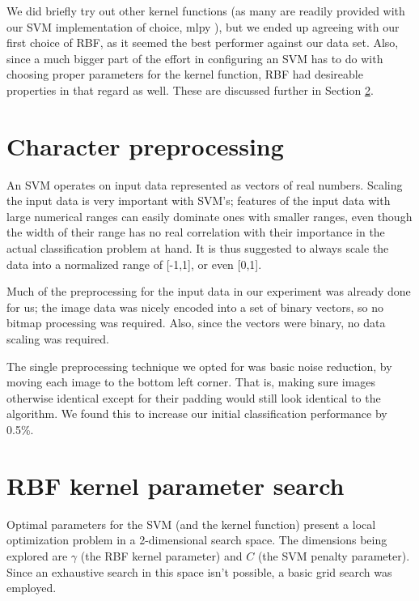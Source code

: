 \documentclass{netsec2012}
\begin{document}
We did briefly try out other kernel functions (as many are readily provided with our SVM
implementation of choice, mlpy \cite{albanese12mlpy}), but we ended up agreeing with our first
choice of RBF, as it seemed the best performer against our data set.  Also, since a much bigger part
of the effort in configuring an SVM has to do with choosing proper parameters for the kernel
function, RBF had desireable properties in that regard as well.  These are discussed further in
Section \ref{ref:kernelparamsearch}.

\section{Character preprocessing}

An SVM operates on input data represented as vectors of real numbers.  Scaling the input data is
very important with SVM's; features of the input data with large numerical ranges can easily
dominate ones with smaller ranges, even though the width of their range has no real correlation with
their importance in the actual classification problem at hand.  It is thus suggested to always scale
the data into a normalized range of [-1,1], or even [0,1]. \cite{libsvm_guide}

Much of the preprocessing for the input data in our experiment was already done for us; the image
data was nicely encoded into a set of binary vectors, so no bitmap processing was required.  Also,
since the vectors were binary, no data scaling was required.

The single preprocessing technique we opted for was basic noise reduction, by moving each image to
the bottom left corner.  That is, making sure images otherwise identical except for their padding
would still look identical to the algorithm.  We found this to increase our initial classification
performance by 0.5\%.


\section{RBF kernel parameter search}

\label{ref:kernelparamsearch}

Optimal parameters for the SVM (and the kernel function) present a local optimization problem in a
2-dimensional search space.  The dimensions being explored are $\gamma$ (the RBF kernel parameter)
and $C$ (the SVM penalty parameter).  Since an exhaustive search in this space isn't possible, a
basic grid search was employed.
\end{document}
